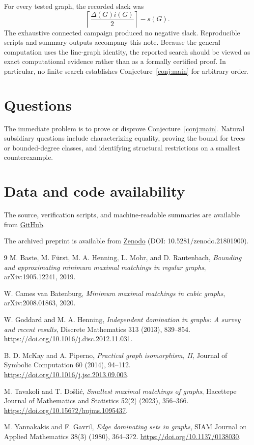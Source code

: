\documentclass[11pt]{article}
\newcommand{\sat}{s}
\begin{document}
For every tested graph, the recorded slack was
\[
 \left\lceil\frac{\Delta(G)i(G)}2\right\rceil-\sat(G).
\]
The exhaustive connected campaign produced no negative slack. Reproducible scripts and summary outputs accompany this note. Because the general computation uses the line-graph identity, the reported search should be viewed as exact computational evidence rather than as a formally certified proof. In particular, no finite search establishes Conjecture~\ref{conj:main} for arbitrary order.

\section{Questions}
The immediate problem is to prove or disprove Conjecture~\ref{conj:main}. Natural subsidiary questions include characterizing equality, proving the bound for trees or bounded-degree classes, and identifying structural restrictions on a smallest counterexample.

\section*{Data and code availability}
The source, verification scripts, and machine-readable summaries are available from
\href{https://github.com/hermespromox/degree-independent-domination-saturation-conjecture}{GitHub}.

The archived preprint is available from
\href{https://doi.org/10.5281/zenodo.21801900}{Zenodo} (DOI: 10.5281/zenodo.21801900).

\begin{thebibliography}{9}
M. Baste, M. F\"urst, M. A. Henning, L. Mohr, and D. Rautenbach,
\emph{Bounding and approximating minimum maximal matchings in regular graphs},
arXiv:1905.12241, 2019.

W. Cames van Batenburg,
\emph{Minimum maximal matchings in cubic graphs},
arXiv:2008.01863, 2020.

W. Goddard and M. A. Henning,
\emph{Independent domination in graphs: A survey and recent results},
Discrete Mathematics 313 (2013), 839--854.
\url{https://doi.org/10.1016/j.disc.2012.11.031}.

B. D. McKay and A. Piperno,
\emph{Practical graph isomorphism, II},
Journal of Symbolic Computation 60 (2014), 94--112.
\url{https://doi.org/10.1016/j.jsc.2013.09.003}.

M. Tavakoli and T. Do\v{s}li\'c,
\emph{Smallest maximal matchings of graphs},
Hacettepe Journal of Mathematics and Statistics 52(2) (2023), 356--366.
\url{https://doi.org/10.15672/hujms.1095437}.

M. Yannakakis and F. Gavril,
\emph{Edge dominating sets in graphs},
SIAM Journal on Applied Mathematics 38(3) (1980), 364--372.
\url{https://doi.org/10.1137/0138030}.
\end{thebibliography}
\end{document}
